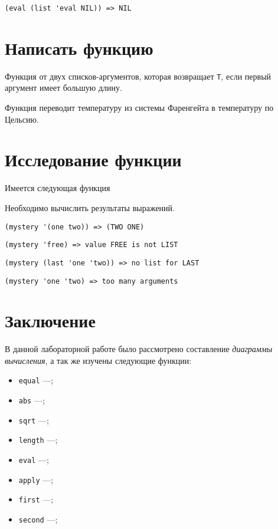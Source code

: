 \problem \hfill
\begin{lstlisting}
(eval (list 'eval NIL)) => NIL
\end{lstlisting}



\section{Написать функцию}

\problem Функция от двух списков-аргументов, которая возвращает \verb|T|, если первый аргумент имеет большую длину.



\problem Функция переводит температуру из системы Фаренгейта в температуру по Цельсию.




\section{Исследование функции}

Имеется следующая функция


\noindent
Необходимо вычислить результаты выражений.


\problem \hfill
\begin{lstlisting}
(mystery '(one two)) => (TWO ONE)
\end{lstlisting}


\problem \hfill
\begin{lstlisting}
(mystery 'free) => value FREE is not LIST
\end{lstlisting}


\problem \hfill
\begin{lstlisting}
(mystery (last 'one 'two)) => no list for LAST
\end{lstlisting}


\problem \hfill
\begin{lstlisting}
(mystery 'one 'two) => too many arguments
\end{lstlisting}



\section{Заключение}

В данной лабораторной работе было рассмотрено составление \textit{диаграммы вычисления}, а так же изучены следующие функции:
\begin{itemize}
	\item \verb|equal| ---;
	\item \verb|abs| ---;
	\item \verb|sqrt| ---;
	\item \verb|length| ---;
	\item \verb|eval| ---;
	\item \verb|apply| ---;
	\item \verb|first| ---;
	\item \verb|second| ---;
\end{itemize}